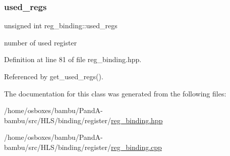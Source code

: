 \subsubsection{\texorpdfstring{used\+\_\+regs}{used\_regs}}
{\footnotesize\ttfamily unsigned int reg\+\_\+binding\+::used\+\_\+regs\hspace{0.3cm}{\ttfamily [protected]}}



number of used register 



Definition at line 81 of file reg\+\_\+binding.\+hpp.



Referenced by get\+\_\+used\+\_\+regs().



The documentation for this class was generated from the following files\+:\begin{DoxyCompactItemize}
\item 
/home/osboxes/bambu/\+Pand\+A-\/bambu/src/\+H\+L\+S/binding/register/\hyperlink{reg__binding_8hpp}{reg\+\_\+binding.\+hpp}\item 
/home/osboxes/bambu/\+Pand\+A-\/bambu/src/\+H\+L\+S/binding/register/\hyperlink{reg__binding_8cpp}{reg\+\_\+binding.\+cpp}\end{DoxyCompactItemize}
